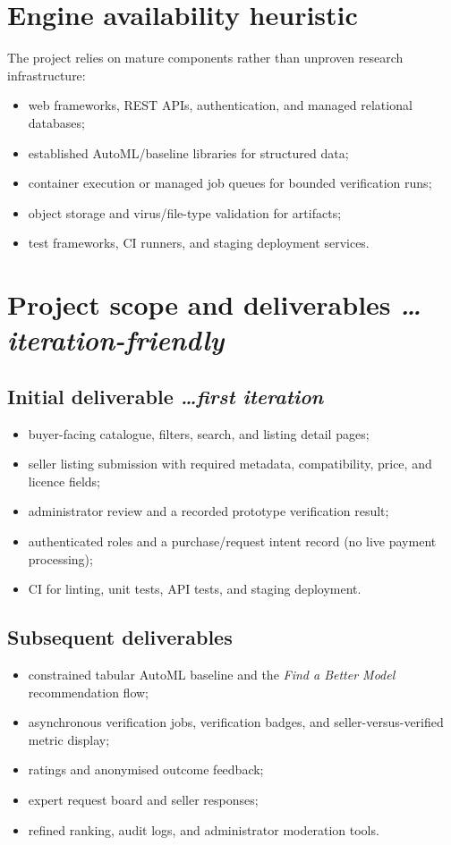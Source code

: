 \documentclass[11pt,a4paper]{article}
\newcommand{\BvrHint}[1]{{\normalfont\normalsize\itshape\hfill #1}}
\begin{document}
\section{Engine availability heuristic}
The project relies on mature components rather than unproven research infrastructure:
\begin{itemize}[leftmargin=0.7cm]
  \item web frameworks, REST APIs, authentication, and managed relational databases;
  \item established AutoML/baseline libraries for structured data;
  \item container execution or managed job queues for bounded verification runs;
  \item object storage and virus/file-type validation for artifacts;
  \item test frameworks, CI runners, and staging deployment services.
\end{itemize}

\section{Project scope and deliverables \BvrHint{\ldots iteration-friendly}}
\subsection{Initial deliverable \BvrHint{\ldots first iteration}}
\begin{itemize}[leftmargin=0.7cm]
  \item buyer-facing catalogue, filters, search, and listing detail pages;
  \item seller listing submission with required metadata, compatibility, price, and licence fields;
  \item administrator review and a recorded prototype verification result;
  \item authenticated roles and a purchase/request intent record (no live payment processing);
  \item CI for linting, unit tests, API tests, and staging deployment.
\end{itemize}

\subsection{Subsequent deliverables}
\begin{itemize}[leftmargin=0.7cm]
  \item constrained tabular AutoML baseline and the \emph{Find a Better Model} recommendation flow;
  \item asynchronous verification jobs, verification badges, and seller-versus-verified metric display;
  \item ratings and anonymised outcome feedback;
  \item expert request board and seller responses;
  \item refined ranking, audit logs, and administrator moderation tools.
\end{itemize}
\end{document}
